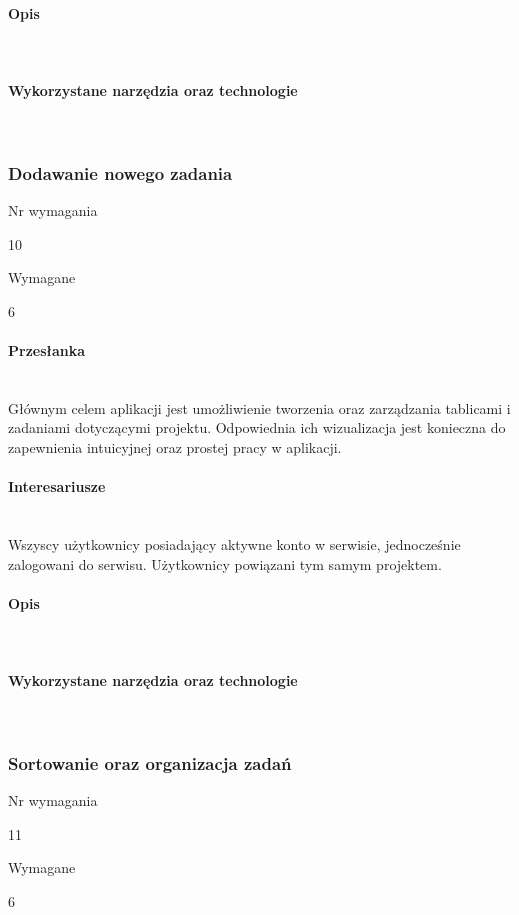 \documentclass[eng,printmode]{mgr}
\begin{document}
\paragraph{Opis}\ \\

\paragraph{Wykorzystane narzędzia oraz technologie}\ \\
\newpage

\subsubsection{Dodawanie nowego zadania}
\begin{labeling}{Nr wymagania}
\item [Nr wymagania:] 10
\item [Typ:] Wymagane
\item [Powiązania:] 6
\end{labeling}

\paragraph{Przesłanka}\ \\
Głównym celem aplikacji jest umożliwienie tworzenia oraz zarządzania tablicami i zadaniami dotyczącymi projektu. Odpowiednia ich wizualizacja jest konieczna do zapewnienia intuicyjnej oraz prostej pracy w aplikacji.

\paragraph{Interesariusze}\ \\
Wszyscy użytkownicy posiadający aktywne konto w serwisie, jednocześnie zalogowani do serwisu. Użytkownicy powiązani tym samym projektem.

\paragraph{Opis}\ \\

\paragraph{Wykorzystane narzędzia oraz technologie}\ \\
\newpage

\subsubsection{Sortowanie oraz organizacja zadań}
\begin{labeling}{Nr wymagania}
\item [Nr wymagania:] 11
\item [Typ:] Wymagane
\item [Powiązania:] 6
\end{labeling}
\end{document}
